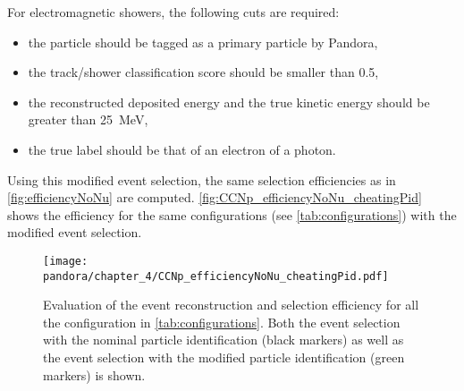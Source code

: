 \noindent
For electromagnetic showers, the following cuts are required: \begin{itemize}
    \item the particle should be tagged as a primary particle by Pandora,
    \item the track/shower classification score should be smaller than 0.5,
    \item the reconstructed deposited energy and the true kinetic energy should be greater than \SI{25}{\MeV},
    \item the true label should be that of an electron of a photon. 
\end{itemize} 

Using this modified event selection, the same selection efficiencies as in \autoref{fig:efficiencyNoNu} are computed. \autoref{fig:CCNp_efficiencyNoNu_cheatingPid} shows the efficiency for the same configurations (see \autoref{tab:configurations}) with the modified event selection. 

\begin{figure}
    \centering
    \texttt{[image: pandora/chapter\_4/CCNp\_efficiencyNoNu\_cheatingPid.pdf]}
    \caption[Evaluation of the reconstruction and selection efficiency for different configurations with the modified event selection]{Evaluation of the event reconstruction and selection efficiency for all the configuration in \autoref{tab:configurations}. Both the event selection with the nominal particle identification (black markers) as well as the event selection with the modified particle identification (green markers) is shown. }
    \label{fig:CCNp_efficiencyNoNu_cheatingPid}
\end{figure}

